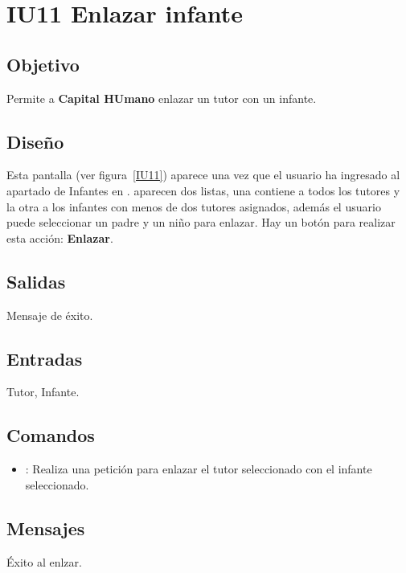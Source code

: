 \newpage
\section{IU11 Enlazar infante}

\subsection{Objetivo}
	Permite a {\bf Capital HUmano} enlazar un tutor con un infante.

\subsection{Diseño}
	Esta pantalla  (ver figura~\ref{IU11}) aparece una vez que el usuario ha ingresado al apartado de Infantes en . 
    aparecen dos listas, una contiene a todos los tutores y la otra a los infantes con menos de dos tutores asignados, además el usuario puede seleccionar un padre y un niño para enlazar. Hay un botón para realizar esta acción: {\bf Enlazar}. 

 

\subsection{Salidas}

	Mensaje de éxito.

\subsection{Entradas}
Tutor, Infante.

\subsection{Comandos}
\begin{itemize}
	\item {}: Realiza una petición para enlazar el tutor seleccionado con el infante seleccionado.
\end{itemize}

\subsection{Mensajes}

\begin{Citemize}
	\item Éxito al enlzar.
\end{Citemize}

